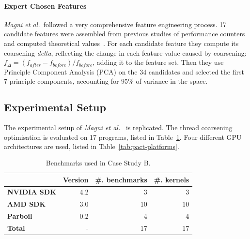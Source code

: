 



\paragraph*{Expert Chosen Features}

\emph{Magni et al.\ }followed a very comprehensive feature engineering process. 17 candidate features were assembled from previous studies of performance counters and computed theoretical values~\cite{Magni2,Sim2012}. For each candidate feature they compute its coarsening \emph{delta}, reflecting the change in each feature value caused by coarsening: $f_{\Delta} = (f_{after} - f_{before}) / f_{before}$, adding it to the feature set. Then they use Principle Component Analysis (PCA) on the 34 candidates and selected the first 7 principle components, accounting for 95\% of variance in the space.

\subsection{Experimental Setup}

The experimental setup of \emph{Magni et al.}~\cite{Magni2014} is replicated. The thread coarsening optimisation is evaluated on 17 programs, listed in Table~\ref{tab:pact-benchmarks}. Four different GPU architectures are used, listed in Table~\ref{tab:pact-platforms}.

\begin{table}
	\centering%
	\begin{tabular}{| l r r r |}
		\hline
		\rowcolor{gray!50}
		& \textbf{Version} & \textbf{\#. benchmarks} & \textbf{\#. kernels}\\
		\hline
		\textbf{NVIDIA SDK} & 4.2 & 3 & 3 \\
		\textbf{AMD SDK} & 3.0 & 10 & 10 \\
		\textbf{Parboil~\cite{Stratton2012}} & 0.2 & 4 & 4 \\
		\textbf{Total} & - & 17 & 17 \\
		\hline
	\end{tabular}
	\label{tab:pact-benchmarks}
  \caption[Benchmarks used in Case Study B]{%
	  Benchmarks used in Case Study B.%
  }
\end{table}

